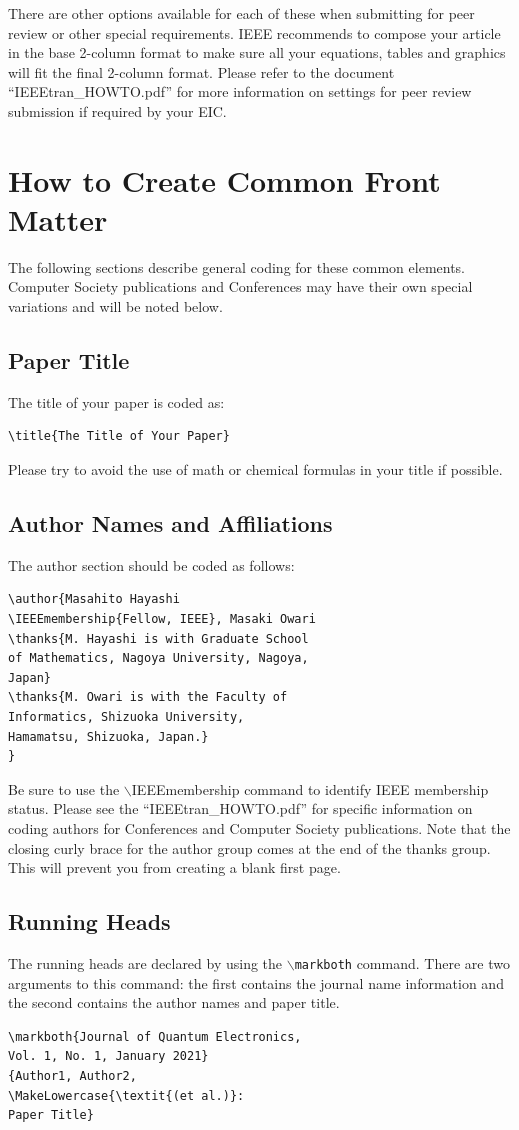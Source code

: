 \documentclass[lettersize,journal]{IEEEtran}
\begin{document}
There are other options available for each of these when submitting for peer review or other special requirements. IEEE recommends to compose your article in the base 2-column format to make sure all your equations, tables and graphics will fit the final 2-column format. Please refer to the document ``IEEEtran\_HOWTO.pdf'' for more information on settings for peer review submission if required by your EIC.

\section{How to Create Common Front Matter}
\noindent The following sections describe general coding for these common elements. Computer Society publications and Conferences may have their own special variations and will be noted below.
\subsection{Paper Title}
\noindent The title of your paper is coded as:

\begin{verbatim}
\title{The Title of Your Paper}
\end{verbatim}

\noindent Please try to avoid the use of math or chemical formulas in your title if possible.

\subsection{Author Names and Affiliations}
\noindent The author section should be coded as follows:
\begin{verbatim}
\author{Masahito Hayashi
\IEEEmembership{Fellow, IEEE}, Masaki Owari
\thanks{M. Hayashi is with Graduate School
of Mathematics, Nagoya University, Nagoya,
Japan}
\thanks{M. Owari is with the Faculty of
Informatics, Shizuoka University,
Hamamatsu, Shizuoka, Japan.}
}
\end{verbatim}
Be sure to use the $\backslash$IEEEmembership command to identify IEEE membership status.
Please see the ``IEEEtran\_HOWTO.pdf'' for specific information on coding authors for Conferences and Computer Society publications. Note that the closing curly brace for the author group comes at the end of the thanks group. This will prevent you from creating a blank first page.

\subsection{Running Heads}
\noindent The running heads are declared by using the $\backslash${\tt{markboth}} command. There are two arguments to this command: the first contains the journal name information and the second contains the author names and paper title.
\begin{verbatim}
\markboth{Journal of Quantum Electronics,
Vol. 1, No. 1, January 2021}
{Author1, Author2,
\MakeLowercase{\textit{(et al.)}:
Paper Title}
\end{verbatim}
\end{document}
